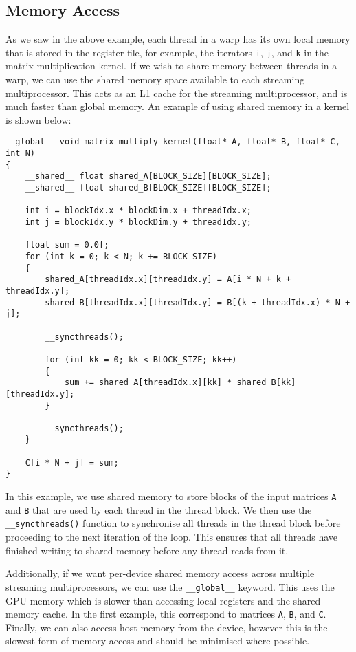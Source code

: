 \documentclass{article}
\begin{document}
\subsection{Memory Access}
As we saw in the above example, each thread in a warp has its own local
memory that is stored in the register file, for example, the iterators
\texttt{i}, \texttt{j}, and \texttt{k} in
the matrix multiplication kernel. If we wish to share memory between
threads in a warp, we can use the shared memory space available to each
streaming multiprocessor. This acts as an L1 cache for the streaming
multiprocessor, and is much faster than global memory. An example of
using shared memory in a kernel is shown below:
\begin{verbatim}
__global__ void matrix_multiply_kernel(float* A, float* B, float* C, int N)
{
    __shared__ float shared_A[BLOCK_SIZE][BLOCK_SIZE];
    __shared__ float shared_B[BLOCK_SIZE][BLOCK_SIZE];

    int i = blockIdx.x * blockDim.x + threadIdx.x;
    int j = blockIdx.y * blockDim.y + threadIdx.y;

    float sum = 0.0f;
    for (int k = 0; k < N; k += BLOCK_SIZE)
    {
        shared_A[threadIdx.x][threadIdx.y] = A[i * N + k + threadIdx.y];
        shared_B[threadIdx.x][threadIdx.y] = B[(k + threadIdx.x) * N + j];

        __syncthreads();

        for (int kk = 0; kk < BLOCK_SIZE; kk++)
        {
            sum += shared_A[threadIdx.x][kk] * shared_B[kk][threadIdx.y];
        }

        __syncthreads();
    }

    C[i * N + j] = sum;
}
\end{verbatim}
In this example, we use shared memory to store blocks of the input
matrices \texttt{A} and \texttt{B} that are used by
each thread in the thread block. We then use the
\texttt{__syncthreads()} function to synchronise all threads
in the thread block before proceeding to the next iteration of the
loop. This ensures that all threads have finished writing to shared
memory before any thread reads from it.

Additionally, if we want per-device shared memory access across
multiple streaming multiprocessors, we can use the
\texttt{__global__} keyword. This uses the GPU memory which is
slower than accessing local registers and the shared memory cache. In
the first example, this correspond to matrices \texttt{A},
\texttt{B}, and \texttt{C}. Finally, we can also
access host memory from the device, however this is the slowest form of
memory access and should be minimised where possible.
\end{document}
